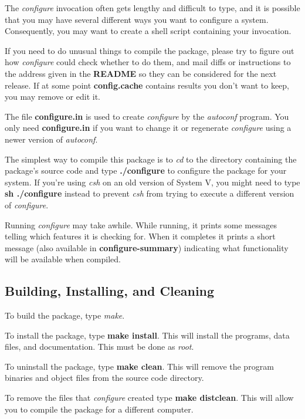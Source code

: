 \documentclass[12pt]{article}
\newcommand{\cmd}[1]{{\em #1}}
\newcommand{\path}[1]{{\bf #1}}
\newcommand{\xqt}[1]{{\bf #1}}
\begin{document}
The \cmd{configure} invocation often gets lengthy and difficult to type, and
it is possible that you may have several different ways you want to configure
a system.  Consequently, you may want to create a shell script containing
your invocation.

If you need to do unusual things to compile the package, please try to figure
out how \cmd{configure} could check whether to do them, and mail diffs or
instructions to the address given in the \path{README} so they can be
considered for the next release.  If at some point \path{config.cache}
contains results you don't want to keep, you may remove or edit it.

The file \path{configure.in} is used to create \cmd{configure} by the
\cmd{autoconf} program.  You only need \path{configure.in} if you want to
change it or regenerate \cmd{configure} using a newer version of \cmd{autoconf}.

The simplest way to compile this package is to \cmd{cd} to the directory
containing the package's source code and type \xqt{./configure} to configure
the package for your system.  If you're  using \cmd{csh} on an old version
of System V, you might need to type \xqt{sh ./configure} instead to prevent
\cmd{csh} from trying to execute a different version of \cmd{configure}.

Running \cmd{configure} may take awhile.  While running, it prints some
messages telling which features it is checking for.  When it completes it
prints a short message (also available in \path{configure-summary})
indicating what functionality will be available when compiled.


\subsection{Building, Installing, and Cleaning}

To build the package, type \cmd{make}.

To install the package, type \xqt{make install}.  This will install the
programs, data files, and documentation.
This must be done as {\it root}.

To uninstall the package, type \xqt{make clean}.  This will remove the program
binaries and object files from the source code directory.

To remove the files that \cmd{configure} created type \xqt{make distclean}.
This will allow you to compile the package for a different computer.
\end{document}
